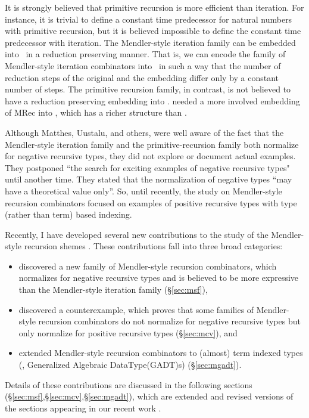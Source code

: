 It is strongly believed that primitive recursion is more efficient than
iteration. For instance, it is trivial to define a constant time predecessor
for natural numbers with primitive recursion, but it is believed impossible
to define the constant time predecessor with iteration. The Mendler-style
iteration family can be embedded into \Fw\ in a reduction preserving manner.
That is, we can encode the family of Mendler-style iteration combinators
into \Fw\ in such a way that the number of reduction steps of the original
and the embedding differ only by a constant number of steps. The primitive
recursion family, in contrast, is not believed to have a reduction preserving
embedding into \Fw. \citet{AbeMat04} needed a more involved embedding of
\textsf{MRec} into \Fixw, which has a richer structure than \Fw.

Although Matthes, Uustalu, and others, were well aware of the fact that
the Mendler-style iteration family and the primitive-recursion family both
normalize for negative recursive types, they did not explore or document actual
examples. They postponed ``the search for exciting examples of negative
recursive types" until another time. They stated that the normalization
of negative types ``may have a theoretical value
only''\cite{UusVen99}. So, until recently, the study on Mendler-style recursion
combinators focused on examples of positive recursive types with type (rather than term) based indexing. %

Recently, I have developed several new contributions to the study of
the Mendler-style recursion shemes \cite{AhnShe11}. These contributions
fall into three broad categories:
\begin{itemize}
\item discovered a new family of Mendler-style recursion combinators,
	which normalizes for negative recursive types and is believed
	to be more expressive than the Mendler-style iteration family
	(\S\ref{sec:msf}),
\item discovered a counterexample, which proves that
	some families of Mendler-style recursion combinators
	do not normalize for negative recursive types
	but only normalize for positive recursive types (\S\ref{sec:mcv}), and
\item extended Mendler-style recursion combinators to (almost)
	term indexed types (\ie, Generalized Algebraic DataType(GADT)s)
	(\S\ref{sec:mgadt}).
\end{itemize}
Details of these contributions are discussed in the following sections
(\S\ref{sec:msf},\S\ref{sec:mcv},\S\ref{sec:mgadt}), which are extended and
revised versions of the sections appearing in our recent work \cite{AhnShe11}.

